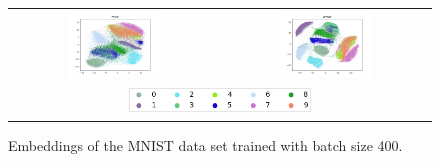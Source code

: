 \begin{figure}[!htb]
  \centering
  \begin{tabular}{cc}
    \includegraphics[width=0.45\textwidth]{images/mnist_ptsne_embedding.png} &
    \includegraphics[width=0.45\textwidth]{images/mnist_vptsne_embedding.png} \\
    \multicolumn{2}{c}{\includegraphics[width=0.45\textwidth]{images/mnist_legend.png}}
  \end{tabular}
  \caption{Embeddings of the MNIST data set trained with batch size 400.}
  \label{fig:mnist_comparison}
\end{figure}

